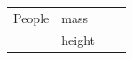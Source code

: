 {{\begin{center}
\begin{tabular}[t]{|l|l|l|l|}
    
        People &
    
    
        mass &
    
    
         &
    
    
     \tabularnewline\cline{1-1}\cline{2-2}\cline{3-3}\cline{4-4}
    
    
         &
    
    
        height &
    
    
         &
    
    
     \tabularnewline\cline{1-1}\cline{2-2}\cline{3-3}\cline{4-4}
    

\end{tabular}
\end{center}}}
